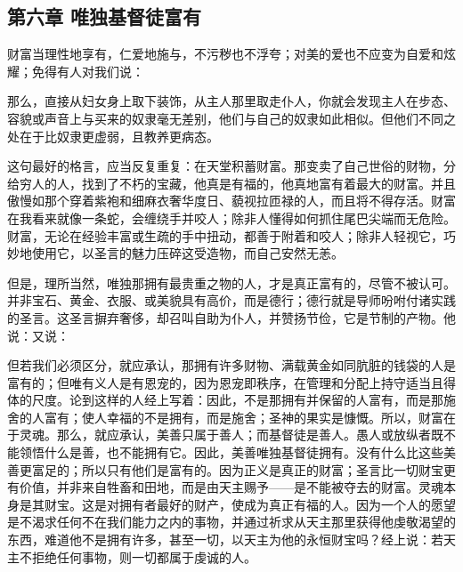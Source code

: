 \subsection{第六章 唯独基督徒富有}

财富当理性地享有，仁爱地施与，不污秽也不浮夸；对美的爱也不应变为自爱和炫耀；免得有人对我们说：\par

那么，直接从妇女身上取下装饰，从主人那里取走仆人，你就会发现主人在步态、容貌或声音上与买来的奴隶毫无差别，他们与自己的奴隶如此相似。但他们不同之处在于比奴隶更虚弱，且教养更病态。\par

这句最好的格言，应当反复重复：在天堂积蓄财富。那变卖了自己世俗的财物，分给穷人的人，找到了不朽的宝藏，他真是有福的，他真地富有着最大的财富。并且傲慢如那个穿着紫袍和细麻衣奢华度日、藐视拉匝禄的人，而且将不得存活。财富在我看来就像一条蛇，会缠绕手并咬人；除非人懂得如何抓住尾巴尖端而无危险。财富，无论在经验丰富或生疏的手中扭动，都善于附着和咬人；除非人轻视它，巧妙地使用它，以圣言的魅力压碎这受造物，而自己安然无恙。\par

但是，理所当然，唯独那拥有最贵重之物的人，才是真正富有的，尽管不被认可。并非宝石、黄金、衣服、或美貌具有高价，而是德行；德行就是导师吩咐付诸实践的圣言。这圣言摒弃奢侈，却召叫自助为仆人，并赞扬节俭，它是节制的产物。他说：又说：\par

但若我们必须区分，就应承认，那拥有许多财物、满载黄金如同肮脏的钱袋的人是富有的；但唯有义人是有恩宠的，因为恩宠即秩序，在管理和分配上持守适当且得体的尺度。论到这样的人经上写着：因此，不是那拥有并保留的人富有，而是那施舍的人富有；使人幸福的不是拥有，而是施舍；圣神的果实是慷慨。所以，财富在于灵魂。那么，就应承认，美善只属于善人；而基督徒是善人。愚人或放纵者既不能领悟什么是善，也不能拥有它。因此，美善唯独基督徒拥有。没有什么比这些美善更富足的；所以只有他们是富有的。因为正义是真正的财富；圣言比一切财宝更有价值，并非来自牲畜和田地，而是由天主赐予——是不能被夺去的财富。灵魂本身是其财宝。这是对拥有者最好的财产，使成为真正有福的人。因为一个人的愿望是不渴求任何不在我们能力之内的事物，并通过祈求从天主那里获得他虔敬渴望的东西，难道他不是拥有许多，甚至一切，以天主为他的永恒财宝吗？经上说：若天主不拒绝任何事物，则一切都属于虔诚的人。\par

